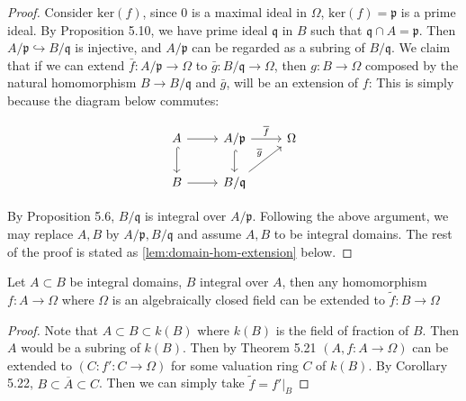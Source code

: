 \documentclass{solution}
\begin{document}
\begin{proof}
    Consider $\mathrm{ker}(f)$, since $0$ is a maximal ideal in $\Omega$, $\mathrm{ker}(f) = \mathfrak{p}$ is a prime ideal. By Proposition 5.10, we have prime ideal $\mathfrak{q}$ in $B$ such that $\mathfrak{q} \cap A = \mathfrak{p}$. Then $A / \mathfrak{p} \hookrightarrow B / \mathfrak{q}$ is injective, and $A / \mathfrak{p}$ can be regarded as a subring of $B / \mathfrak{q}$. We claim that if we can extend $\bar{f}: A / \mathfrak{p} \rightarrow \Omega$ to $\bar{g}: B / \mathfrak{q} \rightarrow \Omega$, then $g: B \rightarrow \Omega$ composed by the natural homomorphism $B \rightarrow B / \mathfrak{q}$ and $\bar{g}$, will be an extension of $f$: This is simply because the diagram below commutes:

    \[\begin{tikzcd}
        A & {A/\mathfrak{p}} & \Omega \\
        B & {B/\mathfrak{q}}
        \arrow[from=1-1, to=1-2]
        \arrow[hook, from=1-1, to=2-1]
        \arrow["{\overline{f}}", from=1-2, to=1-3]
        \arrow[hook, from=1-2, to=2-2]
        \arrow[from=2-1, to=2-2]
        \arrow["{\overline{g}}", from=2-2, to=1-3]
    \end{tikzcd}\]

    By Proposition 5.6, $B / \mathfrak{q}$ is integral over $A / \mathfrak{p}$. Following the above argument, we may replace $A, B$ by $A / \mathfrak{p}, B / \mathfrak{q}$ and assume $A, B$ to be integral domains. The rest of the proof is stated as \ref{lem:domain-hom-extension} below.
\end{proof}

\begin{lemma}\label{lem:domain-hom-extension}
    Let $A \subset B$ be integral domains, $B$ integral over $A$, then any homomorphism $f: A \rightarrow \Omega$ where $\Omega$ is an algebraically closed field can be extended to $\tilde{f}: B \rightarrow \Omega$
\end{lemma}

\begin{proof}
    Note that $A \subset B \subset k(B)$ where $k(B)$ is the field of fraction of $B$. Then $A$ would be a subring of $k(B)$. Then by Theorem 5.21 $(A, f: A \rightarrow \Omega)$ can be extended to $(C: f': C \rightarrow \Omega)$ for some valuation ring $C$ of $k(B)$. By Corollary 5.22, $B \subset \overline{A} \subset C$. Then we can simply take $\tilde{f} = f'|_B$
\end{proof}
\end{document}
